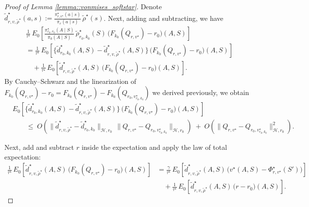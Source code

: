 \documentclass[11pt]{article}
\theoremstyle{plain}
\begin{document}
\begin{proof}[Proof of Lemma \ref{lemma::vonmises_softstar}]
Denote $\widetilde{d}_{r,v,\widetilde{\rho}^\star}^\star(a,s) :=  \frac{\pi_{r,v^\star}^\star(a \mid s)}{\pi_r(a \mid s)}
        \,\widetilde{\rho}^\star(s)$. Next, adding and subtracting, we have
\begin{align*}
&\frac{1}{\tau^\star}\,
E_0 \!\left[
        \frac{\pi_{r_0,v_0}^\star(A \mid S)}{\pi_0(A \mid S)}\,
        \widetilde{\rho}_{r_0,k_0}^\star(S)\,
        \bigl(F_{k_0}(Q_{r,v^\star})-r_0\bigr)(A,S)
\right]
\\[6pt]
&=\frac{1}{\tau^\star}\,
E_0 \!\left[
       \bigl\{\widetilde{d}_{r_0,k_0}^\star(A,S) - \widetilde{d}_{r,v,\widetilde{\rho}^\star}^\star(A,S)\bigr\}\,
        \bigl(F_{k_0}(Q_{r,v^\star})-r_0\bigr)(A,S)
\right]
\\
&\quad + \frac{1}{\tau^\star}\,
E_0 \!\left[
      \widetilde{d}_{r,v,\widetilde{\rho}^\star}^\star(A,S)\,
        \bigl(F_{k_0}(Q_{r,v^\star})-r_0\bigr)(A,S)
\right].
\end{align*}
By Cauchy--Schwarz and the linearization of $F_{k_0}(Q_{r,v^\star})-r_0
= F_{k_0}(Q_{r,v^\star})-F_{k_0}(Q_{r_0,v_{r_0,k_0}^\star})$ we derived previously,
we obtain
\begin{align*}
    &E_0 \!\left[
       \bigl\{\widetilde{d}_{r_0,k_0}^\star(A,S) - \widetilde{d}_{r,v,\widetilde{\rho}^\star}^\star(A,S)\bigr\}\,
        \bigl(F_{k_0}(Q_{r,v^\star})-r_0\bigr)(A,S)
    \right] \\
    &\qquad \le\;
    O\!\left(
        \bigl\|\widetilde{d}_{r,v,\widetilde{\rho}^\star}^\star - \widetilde{d}_{r_0,k_0}^\star\bigr\|_{\mathcal{H},r_0}\,
        \bigl\|Q_{r,v^\star} - Q_{r_0,v_{r_0,k_0}^\star}\bigr\|_{\mathcal{H},r_0}
    \right)
    \;+\;
    O\!\left(
        \bigl\|Q_{r,v^\star} - Q_{r_0,v_{r_0,k_0}^\star}\bigr\|_{\mathcal{H},r_0}^2
    \right).
\end{align*}



Next, add and subtract \(r\) inside the expectation and apply the law of total expectation:
\begin{align*}
\frac{1}{\tau^\star}\,
E_0 \!\left[
       \widetilde{d}_{r,v,\widetilde{\rho}^\star}^\star(A,S)\,
       \bigl(F_{k_0}(Q_{r,v^\star})-r_0\bigr)(A,S)
\right]
&= \frac{\gamma}{\tau^\star}\,
E_0 \!\left[
       \widetilde{d}_{r,v,\widetilde{\rho}^\star}^\star(A,S)\,
       \bigl(v^\star(A,S) - \Phi_{r,v^\star}^\star(S')\bigr)
\right] \\
&\quad + \frac{1}{\tau^\star}\,
E_0 \!\left[
       \widetilde{d}_{r,v,\widetilde{\rho}^\star}^\star(A,S)\,
       \bigl(r - r_0\bigr)(A,S)
\right].
\end{align*}


\end{proof}
\end{document}
